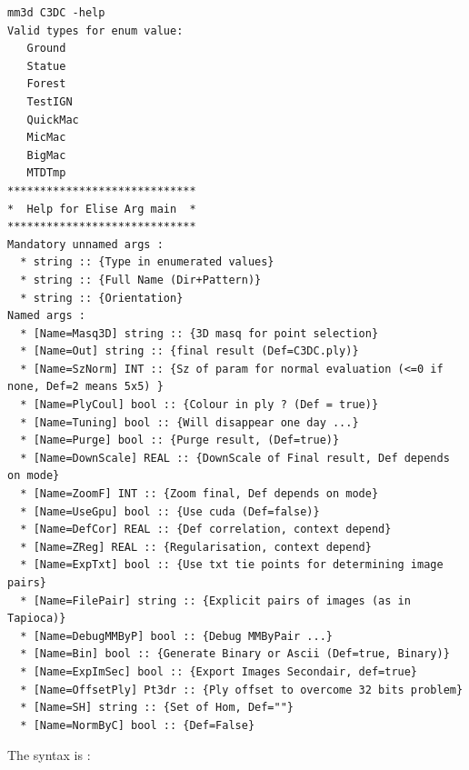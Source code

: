 \begin{verbatim}
mm3d C3DC -help
Valid types for enum value: 
   Ground
   Statue
   Forest
   TestIGN
   QuickMac
   MicMac
   BigMac
   MTDTmp
*****************************
*  Help for Elise Arg main  *
*****************************
Mandatory unnamed args : 
  * string :: {Type in enumerated values}
  * string :: {Full Name (Dir+Pattern)}
  * string :: {Orientation}
Named args : 
  * [Name=Masq3D] string :: {3D masq for point selection}
  * [Name=Out] string :: {final result (Def=C3DC.ply)}
  * [Name=SzNorm] INT :: {Sz of param for normal evaluation (<=0 if none, Def=2 means 5x5) }
  * [Name=PlyCoul] bool :: {Colour in ply ? (Def = true)}
  * [Name=Tuning] bool :: {Will disappear one day ...}
  * [Name=Purge] bool :: {Purge result, (Def=true)}
  * [Name=DownScale] REAL :: {DownScale of Final result, Def depends on mode}
  * [Name=ZoomF] INT :: {Zoom final, Def depends on mode}
  * [Name=UseGpu] bool :: {Use cuda (Def=false)}
  * [Name=DefCor] REAL :: {Def correlation, context depend}
  * [Name=ZReg] REAL :: {Regularisation, context depend}
  * [Name=ExpTxt] bool :: {Use txt tie points for determining image pairs}
  * [Name=FilePair] string :: {Explicit pairs of images (as in Tapioca)}
  * [Name=DebugMMByP] bool :: {Debug MMByPair ...}
  * [Name=Bin] bool :: {Generate Binary or Ascii (Def=true, Binary)}
  * [Name=ExpImSec] bool :: {Export Images Secondair, def=true}
  * [Name=OffsetPly] Pt3dr :: {Ply offset to overcome 32 bits problem}
  * [Name=SH] string :: {Set of Hom, Def=""}
  * [Name=NormByC] bool :: {Def=False}
\end{verbatim}
The syntax is :
